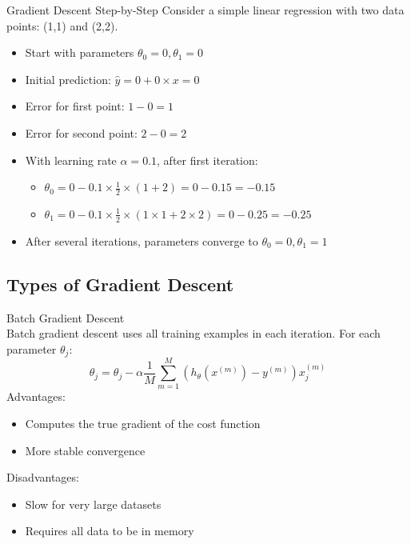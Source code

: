 \begin{example}{Gradient Descent Step-by-Step}
Consider a simple linear regression with two data points: (1,1) and (2,2).
\begin{itemize}
    \item Start with parameters $\theta_0 = 0, \theta_1 = 0$
    \item Initial prediction: $\hat{y} = 0 + 0 \times x = 0$
    \item Error for first point: $1 - 0 = 1$
    \item Error for second point: $2 - 0 = 2$
    \item With learning rate $\alpha = 0.1$, after first iteration:
    \begin{itemize}
        \item $\theta_0 = 0 - 0.1 \times \frac{1}{2} \times (1 + 2) = 0 - 0.15 = -0.15$
        \item $\theta_1 = 0 - 0.1 \times \frac{1}{2} \times (1 \times 1 + 2 \times 2) = 0 - 0.25 = -0.25$
    \end{itemize}
    \item After several iterations, parameters converge to $\theta_0 = 0, \theta_1 = 1$
\end{itemize}
\end{example}

\subsection{Types of Gradient Descent}

\begin{definition}{Batch Gradient Descent}\\
Batch gradient descent uses all training examples in each iteration. For each parameter $\theta_j$:
\[\theta_j = \theta_j - \alpha \frac{1}{M}\sum_{m=1}^{M}(h_\theta(x^{(m)}) - y^{(m)})x^{(m)}_j\]
Advantages:
\begin{itemize}
    \item Computes the true gradient of the cost function
    \item More stable convergence
\end{itemize}
Disadvantages:
\begin{itemize}
    \item Slow for very large datasets
    \item Requires all data to be in memory
\end{itemize}
\end{definition}

